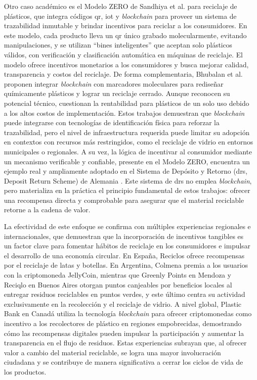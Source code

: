 Otro caso académico es el Modelo ZERO de Sandhiya et al. \cite{sandhiya2020investigating} para reciclaje de plásticos, que integra códigos \gls{qr}, \gls{iot} y \textit{blockchain} para proveer un sistema de trazabilidad inmutable y brindar incentivos para reciclar a los consumidores. En este modelo, cada producto lleva un \gls{qr} único grabado molecularmente, evitando manipulaciones, y se utilizan ``bines inteligentes'' que aceptan solo plásticos válidos, con verificación y clasificación automática en máquinas de reciclaje. El modelo ofrece incentivos monetarios a los consumidores y busca mejorar calidad, transparencia y costos del reciclaje. De forma complementaria, Bhubalan et al. \cite{bhubalan2022blockchain} proponen integrar \textit{blockchain} con marcadores moleculares para rediseñar químicamente plásticos y lograr un reciclaje cerrado. Aunque reconocen su potencial técnico, cuestionan la rentabilidad para plásticos de un solo uso debido a los altos costos de implementación. Estos trabajos demuestran que \textit{blockchain} puede integrarse con tecnologías de identificación física para reforzar la trazabilidad, pero el nivel de infraestructura requerida puede limitar su adopción en contextos con recursos más restringidos, como el reciclaje de vidrio en entornos municipales o regionales. A su vez, la lógica de incentivar al consumidor mediante un mecanismo verificable y confiable, presente en el Modelo ZERO, encuentra un ejemplo real y ampliamente adoptado en el Sistema de Depósito y Retorno (\gls{drs}, Deposit Return Scheme)  de Alemania \cite{picuno2025potential}. Este sistema de \gls{drs} no emplea \textit{blockchain}, pero materializa en la práctica el principio fundamental de estos trabajos: ofrecer una recompensa directa y comprobable para asegurar que el material reciclable retorne a la cadena de valor.

La efectividad de este enfoque se confirma con múltiples experiencias regionales e internacionales, que demuestran que la incorporación de incentivos tangibles es un factor clave para fomentar hábitos de reciclaje en los consumidores e impulsar el desarrollo de una economía circular. En España, Reciclos \cite{reciclos2024} ofrece recompensas por el reciclaje de latas y botellas. En Argentina, Colmena \cite{colmena2024} premia a los usuarios con la \gls{criptomoneda} JellyCoin, mientras que Greenly Points \cite{greenlypoints2024} en Mendoza y Reciqlo en Buenos Aires \cite{innovar2024vidrio} otorgan puntos canjeables por beneficios locales al entregar residuos reciclables en puntos verdes, y este último centra su actividad exclusivamente en la recolección y el reciclaje de vidrio. A nivel global, Plastic Bank en Canadá utiliza la tecnología \textit{blockchain} para ofrecer criptomonedas como incentivo a los recolectores de plástico en regiones empobrecidas, demostrando cómo las recompensas digitales pueden impulsar la participación y aumentar la transparencia en el flujo de residuos. Estas experiencias subrayan que, al ofrecer valor a cambio del material reciclable, se logra una mayor involucración ciudadana y se contribuye de manera significativa a cerrar los ciclos de vida de los productos.


